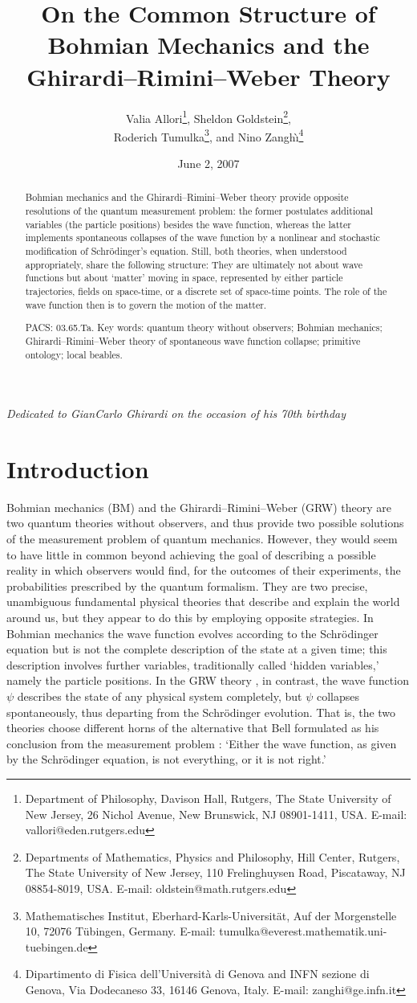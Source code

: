 \documentclass[12pt]{article}
\title{On the Common Structure of Bohmian Mechanics and the
       Ghirardi--Rimini--Weber Theory}
\author{
Valia Allori\footnote{Department of Philosophy, Davison Hall,
     Rutgers, The State University of New Jersey, 26 Nichol Avenue,
     New Brunswick, NJ 08901-1411, USA.
     E-mail: vallori@eden.rutgers.edu},
Sheldon Goldstein\footnote{Departments of Mathematics, Physics and
     Philosophy, Hill Center, Rutgers, The State University of New  
     Jersey, 110 Frelinghuysen Road, Piscataway, NJ 08854-8019, USA.
     E-mail: oldstein@math.rutgers.edu},\\
Roderich Tumulka\footnote{Mathematisches Institut,
     Eberhard-Karls-Universit\"at, Auf der Morgenstelle 10, 72076
     T\"ubingen, Germany. E-mail:
     tumulka@everest.mathematik.uni-tuebingen.de},
 and Nino Zangh\`\i\footnote{Dipartimento di Fisica dell'Universit\`a
     di Genova and INFN sezione di Genova, Via Dodecaneso 33, 16146
     Genova, Italy. E-mail: zanghi@ge.infn.it}
}
\date{June 2, 2007}
\begin{document}
\maketitle
\begin{abstract}
Bohmian mechanics and the Ghirardi--Rimini--Weber theory provide opposite resolutions of the quantum measurement problem:  the former postulates additional variables (the particle positions) besides the wave function, whereas the latter implements spontaneous collapses of the wave function by a nonlinear and stochastic modification of Schr\"odinger's equation. Still, both theories, when understood appropriately, share the following structure: They are ultimately not about wave functions but about `matter' moving in space, represented by either particle trajectories, fields on space-time, or a discrete set of space-time points. The role of the wave function then is to govern the motion of the matter.
\medskip


\noindent 
 PACS: 03.65.Ta. 
 Key words: quantum theory without observers; Bohmian mechanics;
 Ghirardi--Rimini--Weber theory of spontaneous wave function collapse;
 primitive ontology; local beables.
\end{abstract}


\begin{center}
\textit{Dedicated to GianCarlo Ghirardi on the occasion of his 70th birthday}  
\end{center}
\tableofcontents

\section{Introduction}


Bohmian mechanics ({\sf BM}) and the Ghirardi--Rimini--Weber ({\sf GRW})
theory are two quantum theories without observers, and thus provide two
possible solutions of the measurement problem of quantum
mechanics. However, they would seem to have little in common beyond
achieving the goal of describing a possible reality in which observers
would find, for the outcomes of their experiments, the probabilities
prescribed by the quantum formalism. They are two precise, unambiguous
fundamental physical theories that describe and explain the world around
us, but they appear to do this by employing opposite strategies. In Bohmian
mechanics \citep{Bohm52, Bell66, DGZ92, survey} the wave function evolves
according to the Schr\"odinger equation but is not the complete description
of the state at a given time; this description involves further variables,
traditionally called `hidden variables,' namely the particle
positions. In the {\sf GRW} theory \citep{Pe76, GRW86, Bell87, BG03}, in
contrast, the wave function $\psi$ describes the state of any physical
system completely, but $\psi$ collapses spontaneously, thus departing from
the Schr\"odinger evolution.  That is, the two theories choose different
horns of the alternative that Bell formulated as his conclusion from the
measurement problem \citep{Bell87}: `Either the wave function, as given by
the Schr\"odinger equation, is not everything, or it is not right.'
\end{document}
